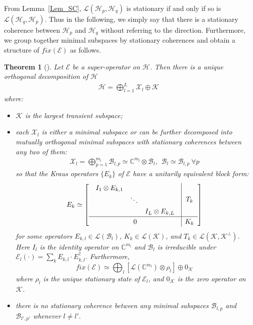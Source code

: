 \documentclass[journal]{IEEEtran}
\def\h{\ensuremath{\mathcal{H}}}
\def\l{\ensuremath{\mathcal{L}}}
\def\k{\ensuremath{\mathcal{K}}}
\def\x{\ensuremath{\mathcal{X}}}
\def\b{\ensuremath{\mathcal{B}}}
\def\e{\ensuremath{\mathcal{E}}}
\def\l{\ensuremath{\mathcal{L}}}
\def\l{\mathcal{L}}
\def\k{\mathcal{K}}
\newtheorem{theorem}{Theorem}
\begin{document}
 From Lemma~\ref{Lem_SC}, $\l(\h_p,\h_q)$ is stationary if and only if so is $\l(\h_q,\h_p)$. Thus in the following, we simply say that there is a stationary coherence between $\h_p$ and $\h_q$ without referring to the direction.
Furthermore,  we group together minimal subspaces by stationary coherences and obtain a structure of $fix(\e)$ as follows. 
\begin{theorem}[\cite{baumgartner2012structure}]\label{Theo_NS_Dec}
  Let $\e$ be a super-operator on $\h$. Then there is a unique  orthogonal decomposition of $\h$
  \begin{eqnarray}\label{Eq_NS_dec_unique}
    \h=\bigoplus_{l=1}^{L}\x_l\oplus \k
  \end{eqnarray}
  where: \begin{itemize}
    \item[(1)] $\k$ is the largest transient subspace;
    \item[(2)] each $\x_l$ is either a minimal subspace or can be further decomposed into mutually orthogonal minimal subspaces with stationary coherences between any two of them:
    \begin{eqnarray}\label{Eq_NS_dec}
      \x_l=\bigoplus_{p=1}^{m_l}\b_{l,p}\simeq\mathbb{C}^{m_l}\otimes \b_l, \ \ \b_l\simeq \b_{l,p} \ \forall p
    \end{eqnarray} 
    so that the Kraus operators $\{E_k\}$ of $\e$ have a unitarily equivalent block form:
  \begin{eqnarray}\label{Eq_SC_dec_Kraus}
    \renewcommand{\arraystretch}{1.2}
E_k\simeq \left[\begin{array}{c|c}
  \begin{array}{ccc}
  I_{1}\otimes E_{k,1} &  &\\
   & \ddots &\\
   & & I_{L}\otimes E_{k,L}  
  \end{array} & T_k\\
  \hline
0&K_k
\end{array}\right]
  \end{eqnarray}
for some operators $E_{k,l}\in \l(\b_l)$, $K_k\in \l(\k)$, and $T_k\in\l(\k,\k^\perp)$. Here  $I_{l}$ is the identity operator on $\mathbb{C}^{m_l}$ and $\b_l$ is irreducible under $\e_{l}(\cdot)=\sum_{k}E_{k,l}\cdot E_{k,l}^\dagger$. Furthermore, 
$$fix(\e)\simeq\bigoplus_{l}[\l(\mathbb{C}^{m_l})\otimes \rho_{l}]\oplus 0_\k $$
    where $\rho_l$ is the unique stationary state of $\e_{l}$, and $0_\k$ is the zero operator on $\k$.
    \item[(3)] there is no stationary coherence between any minimal subspaces $\b_{l, p}$ and $\b_{l', p'}$ whenever $l\neq l'.$  
      \end{itemize}
\end{theorem}
\end{document}

